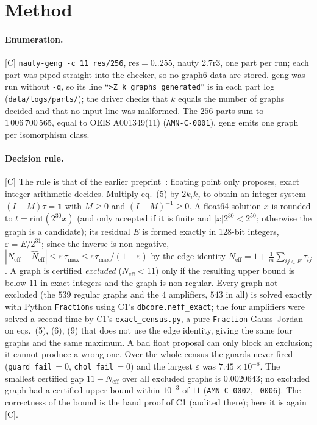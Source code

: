 \documentclass[10pt]{article}
\newcommand{\tier}[1]{\textsf{[#1]}}
\newcommand{\tC}{\tier{C}}
\newcommand{\Neff}{N_{\mathrm{eff}}}
\begin{document}
\section{Method}\label{sec:method}
\paragraph{Enumeration.}\tC{} \texttt{nauty-geng -c 11 res/256}, $\mathrm{res}=0..255$, nauty 2.7r3, one part per run; each part was piped straight into the checker, so no graph6 data are stored. geng was run without \texttt{-q}, so its line ``\texttt{>Z k graphs generated}'' is in each part log (\texttt{data/logs/parts/}); the driver checks that $k$ equals the number of graphs decided and that no input line was malformed. The $256$ parts sum to $1\,006\,700\,565$, equal to OEIS A001349(11) (\texttt{AMN-C-0001}). geng emits one graph per isomorphism class.

\paragraph{Decision rule.}\tC{} The rule is that of the earlier preprint~\cite{c1}: floating point only proposes, exact integer arithmetic decides. Multiply eq.~(5) by $2k_ik_j$ to obtain an integer system $(I-M)\tau=\mathbf 1$ with $M\ge0$ and $(I-M)^{-1}\ge0$. A float64 solution $x$ is rounded to $t=\mathrm{rint}(2^{30}x)$ (and only accepted if it is finite and $|x|2^{30}<2^{50}$; otherwise the graph is a candidate); its residual $E$ is formed exactly in 128-bit integers, $\varepsilon=E/2^{31}$; since the inverse is non-negative, $|\Neff-\hat N_{\mathrm{eff}}|\le\varepsilon\,\tau_{\max}\le\varepsilon\tilde\tau_{\max}/(1-\varepsilon)$ by the edge identity $\Neff=1+\frac1m\sum_{ij\in E}\tau_{ij}$. A graph is certified \emph{excluded} ($\Neff<11$) only if the resulting upper bound is below $11$ in exact integers and the graph is non-regular. Every graph not excluded (the $539$ regular graphs and the $4$ amplifiers, $543$ in all) is solved exactly with Python \texttt{Fraction}s using C1's \texttt{dbcore.neff\_exact}; the four amplifiers were solved a second time by C1's \texttt{exact\_census.py}, a pure-\texttt{Fraction} Gauss--Jordan on eqs.~(5), (6), (9) that does not use the edge identity, giving the same four graphs and the same maximum. A bad float proposal can only block an exclusion; it cannot produce a wrong one. Over the whole census the guards never fired (\texttt{guard\_fail}$\,=0$, \texttt{chol\_fail}$\,=0$) and the largest $\varepsilon$ was $7.45\times10^{-8}$. The smallest certified gap $11-\Neff$ over all excluded graphs is $0.0020643$; no excluded graph had a certified upper bound within $10^{-3}$ of $11$ (\texttt{AMN-C-0002}, \texttt{-0006}). The correctness of the bound is the hand proof of C1 (audited there); here it is again \tC{}.
\end{document}

